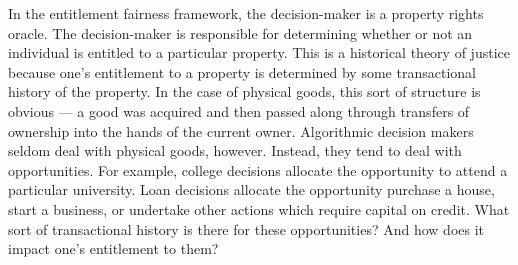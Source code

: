 In the entitlement fairness framework, the decision-maker is a property rights
oracle. The decision-maker is responsible for determining whether or not an
individual is entitled to a particular property. This is a historical theory of
justice because one's entitlement to a property is determined by some
transactional history of the property. In the case of physical goods, this sort
of structure is obvious — a good was acquired and then passed along through
transfers of ownership into the hands of the current owner. Algorithmic decision
makers seldom deal with physical goods, however. Instead, they tend to deal with
opportunities. For example, college decisions allocate the opportunity to attend
a particular university. Loan decisions allocate the opportunity purchase a
house, start a business, or undertake other actions which require capital on
credit. What sort of transactional history is there for these opportunities? And
how does it impact one's entitlement to them?

